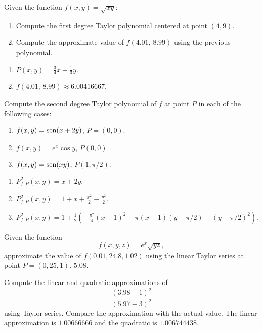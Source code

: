 
{Given the function $f(x,y)=\sqrt{xy}$:
\begin{enumerate}
\item Compute the first degree Taylor polynomial centered at point $(4,9)$.
\item Compute the approximate value of $f(4.01,\,8.99)$ using the previous polynomial.
\end{enumerate}
}
{\begin{enumerate}
\item $P(x,y)= \frac{3}{4}x+\frac{1}{3}y$.
\item $f(4.01,\,8.99)\approx 6.00416667$.
\end{enumerate}
}
{
}


{Compute the second degree Taylor polynomial of $f$ at point $P$ in each of the following cases:
\begin{enumerate}
\item $f(x,y)=\operatorname{sen}(x+2y)$, $P=(0,0)$.
\item $f(x,y)=e^x\cos y$, $P(0,0)$.
\item $f(x,y)=\operatorname{sen}(xy)$, $P(1,\pi/2)$.
\end{enumerate}
}
{\begin{enumerate}
\item $P^2_{f,P}(x,y)= x+2y$.
\item $P^2_{f,P}(x,y)= 1+x+\frac{x^2}{2}-\frac{y^2}{2}$.
\item $P^2_{f,P}(x,y)= 1+\frac{1}{2}\left(-\frac{\pi^2}{4}(x-1)^2-\pi(x-1)(y-\pi/2)-(y-\pi/2)^2\right)$.
\end{enumerate}
}
{
}


{Given the function
\[
f(x,y,z)=e^x\sqrt{yz},
\]
approximate the value of $f(0.01,24.8,1.02)$ using the linear Taylor series at point $P=(0,25,1)$.
}
{$5.08$.
}
{
}


{Compute the linear and quadratic approximations of
\[
\frac{(3.98-1)^2}{(5.97-3)^2}
\]
using Taylor series.
Compare the approximation with the actual value.
}
{The linear approximation is $1.00666666$ and the quadratic is $1.006744438$.
}
{
}
